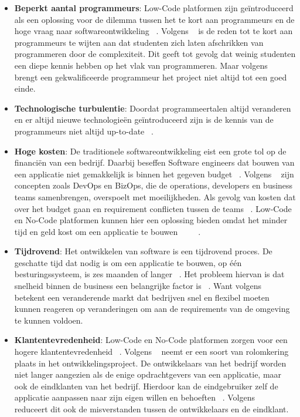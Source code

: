 \begin{itemize}
    \item \textbf{Beperkt aantal programmeurs}: 
    Low-Code platformen zijn geïntroduceerd als een oplossing voor de dilemma tussen het te kort aan programmeurs en de hoge vraag naar softwareontwikkeling ~\autocite{ALSAADI_2021}. Volgens 
    ~\textcite{Moskal_2021} is de reden tot te kort aan programmeurs te wijten aan dat studenten zich laten afschrikken van programmeren door de complexiteit. Dit geeft tot gevolg dat weinig 
    studenten een diepe kennis hebben op het vlak van programmeren. Maar volgens ~\textcite{Moskal_2021} brengt een gekwalificeerde programmeur het project niet altijd tot een goed einde.
    \item \textbf{Technologische turbulentie}:
    Doordat programmeertalen altijd veranderen en er altijd nieuwe technologieën geïntroduceerd zijn is de kennis van de programmeurs niet altijd up-to-date ~\autocite{Moskal_2021}.
    \item \textbf{Hoge kosten}:
    De traditionele softwareontwikkeling eist een grote tol op de financiën van een bedrijf. 
    Daarbij beseffen Software engineers dat bouwen van een applicatie niet gemakkelijk is binnen het gegeven budget ~\autocite{Moskal_2021}. 
    Volgens ~\textcite{Elshan2023} zijn concepten zoals DevOps en BizOps, die de operations, developers en business teams samenbrengen, overspoelt met moeilijkheden. 
    Als gevolg van kosten dat over het budget gaan en requirement conflicten tussen de teams ~\autocite{Elshan2023}. 
    Low-Code en No-Code platformen kunnen hier een oplossing bieden omdat het minder tijd en geld kost om een applicatie te bouwen ~\autocite{Elshan2023} ~\autocite{Bock_2021} ~\autocite{Rokis_2023}.
    \item \textbf{Tijdrovend}:
    Het ontwikkelen van software is een tijdrovend proces. De geschatte tijd dat nodig is om een applicatie te bouwen, op één besturingssysteem, is zes maanden of langer ~\autocite{Moskal_2021}. 
    Het probleem hiervan is dat snelheid binnen de business een belangrijke factor is ~\autocite{Sanchis_2019}. 
    Want volgens ~\textcite{Sanchis_2019} betekent een veranderende markt dat bedrijven snel en flexibel moeten kunnen reageren op veranderingen om aan de requirements van de omgeving te kunnen voldoen.

    \item \textbf{Klantentevredenheid}:
    Low-Code en No-Code platformen zorgen voor een hogere klantentevredenheid ~\autocite{Elshan2023}. 
    Volgens ~\textcite{Elshan2023} neemt er een soort van rolomkering plaats in het ontwikkelingsproject. 
    De ontwikkelaars van het bedrijf worden niet langer aangezien als de enige opdrachtgevers van een applicatie, maar ook de eindklanten van het bedrijf. 
    Hierdoor kan de eindgebruiker zelf de applicatie aanpassen naar zijn eigen willen en behoeften ~\autocite{Elshan2023}. 
    Volgens ~\textcite{Elshan2023} reduceert dit ook de misverstanden tussen de ontwikkelaars en de eindklant.


\end{itemize}
